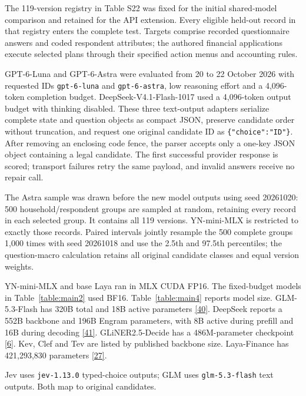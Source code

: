 \documentclass[10pt]{article}
\begin{document}
The 119-version registry in Table S22 was fixed for the initial shared-model comparison and retained for the API extension. Every eligible held-out record in that registry enters the complete test. Targets comprise recorded questionnaire answers and coded respondent attributes; the authored financial applications execute selected plans through their specified action menus and accounting rules.

GPT-6-Luna and GPT-6-Astra were evaluated from 20 to 22 October 2026 with requested IDs \texttt{gpt-6-luna} and \texttt{gpt-6-astra}, low reasoning effort and a 4,096-token completion budget. DeepSeek-V4.1-Flash-1017 used a 4,096-token output budget with thinking disabled. These three text-output adapters serialize complete state and question objects as compact JSON, preserve candidate order without truncation, and request one original candidate ID as \texttt{\{"choice":"ID"\}}. After removing an enclosing code fence, the parser accepts only a one-key JSON object containing a legal candidate. The first successful provider response is scored; transport failures retry the same payload, and invalid answers receive no repair call.

The Astra sample was drawn before the new model outputs using seed 20261020: 500 household/respondent groups are sampled at random, retaining every record in each selected group. It contains all 119 versions. YN-mini-MLX is restricted to exactly those records. Paired intervals jointly resample the 500 complete groups 1,000 times with seed 20261018 and use the 2.5th and 97.5th percentiles; the question-macro calculation retains all original candidate classes and equal version weights.

YN-mini-MLX and base Laya ran in MLX CUDA FP16. The fixed-budget models in Table~\ref{table:main2} used BF16. Table~\ref{table:main4} reports model size. GLM-5.3-Flash has 320B total and 18B active parameters \href{https://docs.z.ai/guides/vlm/glm-5.3-flash}{[40]}. DeepSeek reports a 552B backbone and 196B Engram parameters, with 8B active during prefill and 16B during decoding \href{https://huggingface.co/deepseek-ai/DeepSeek-V4.1-Flash/blob/main/DeepSeek_V41_Tech_Report.pdf}{[41]}. GLiNER2.5-Decide has a 486M-parameter checkpoint \href{https://huggingface.co/fastino/GLiNER2.5-Decide}{[6]}. Kev, Clef and Tev are listed by published backbone size. Laya-Finance has 421,293,830 parameters \href{https://huggingface.co/hravi/laya-finance}{[27]}.

Jev uses \texttt{jev-1.13.0} typed-choice outputs; GLM uses \texttt{glm-5.3-flash} text outputs. Both map to original candidates.
\end{document}
